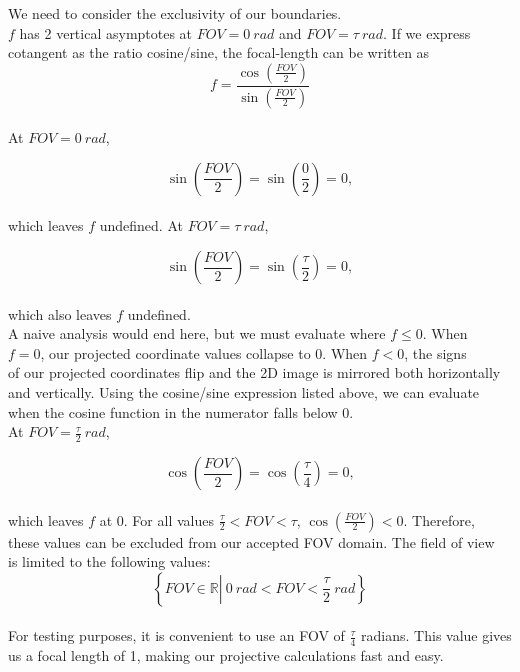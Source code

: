 \documentclass[11.pt]{article}
\begin{document}
We need to consider the exclusivity of our boundaries.\\

$f$ has 2 vertical asymptotes at $FOV=0 \: rad$ and $FOV=\tau \: rad$. If we
express cotangent as the ratio cosine/sine, the focal-length can be written as\\

$$ f=\frac{ \cos\left( \frac{FOV}{2} \right) }
	  { \sin\left( \frac{FOV}{2} \right) } $$\\

At $FOV=0 \: rad$,

$$ \sin\left( \frac{FOV}{2} \right) = 
   \sin\left( \frac{ 0 }{2} \right) = 0, $$\\

which leaves $f$ undefined. At $FOV=\tau \: rad$,

$$ \sin\left( \frac{ FOV}{2} \right) = 
   \sin\left( \frac{\tau}{2} \right) = 0, $$\\

which also leaves $f$ undefined.\\

A naive analysis would end here, but we must evaluate where $f\leq0$. When\\
$f=0$, our projected coordinate values collapse to 0. When $f<0$, the signs\\
of our projected coordinates flip and the 2D image is mirrored both horizontally\\
and vertically. Using the cosine/sine expression listed above, we can evaluate\\
when the cosine function in the numerator falls below 0.\\

At $FOV=\frac{\tau}{2} \: rad$,

$$ \cos\left( \frac{ FOV}{2} \right) = 
   \cos\left( \frac{\tau}{4} \right) = 0, $$\\

which leaves $f$ at 0. For all values $\frac{\tau}{2}<FOV<\tau$,
$\cos\left( \frac{FOV}{2} \right) < 0$. Therefore,\\
these values can be excluded from our accepted FOV domain. The field of view\\
is limited to the following values:\\

$$\left\{ FOV\in\mathbb{R} \left| \: 0 \: rad <FOV<\frac{\tau}{2} \: rad \right. \right\}$$
\\

For testing purposes, it is convenient to use an FOV of $\frac{\tau}{4}$ radians. This
value gives us a focal length of 1, making our projective calculations fast and easy.\\
\end{document}
